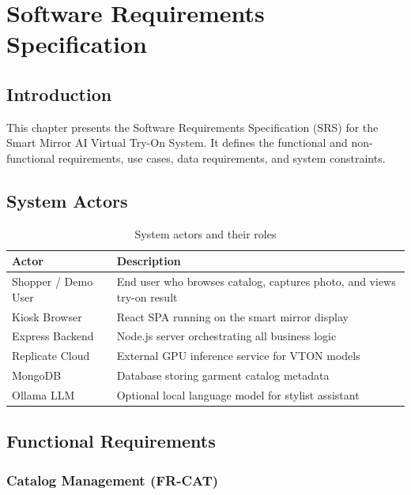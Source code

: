 \chapter{Software Requirements Specification}
\label{ch:srs}

\section{Introduction}
\label{sec:srs-intro}

This chapter presents the Software Requirements Specification (SRS) for the Smart Mirror AI Virtual Try-On System. It defines the functional and non-functional requirements, use cases, data requirements, and system constraints.

\section{System Actors}
\label{sec:actors}

\begin{table}[H]
  \centering
  \caption{System actors and their roles}
  \label{tab:actors}
  \begin{tabular}{@{}lp{10cm}@{}}
    \toprule
    \textbf{Actor} & \textbf{Description} \\
    \midrule
    Shopper / Demo User & End user who browses catalog, captures photo, and views try-on result \\
    Kiosk Browser & React SPA running on the smart mirror display \\
    Express Backend & Node.js server orchestrating all business logic \\
    Replicate Cloud & External GPU inference service for VTON models \\
    MongoDB & Database storing garment catalog metadata \\
    Ollama LLM & Optional local language model for stylist assistant \\
    \bottomrule
  \end{tabular}
\end{table}

\section{Functional Requirements}
\label{sec:functional-requirements}

\subsection{Catalog Management (FR-CAT)}

